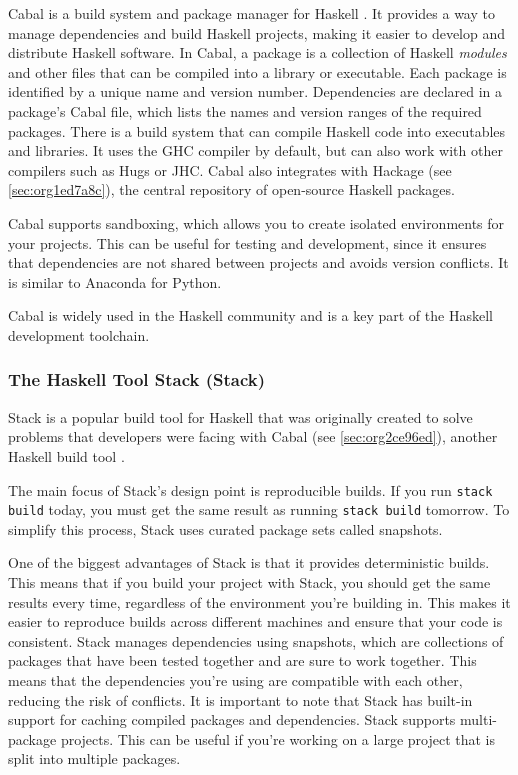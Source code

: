 \documentclass[a4paper, titlepage, twoside]{article}
\begin{document}
Cabal is a build system and package manager for Haskell \autocite{Cabal2023}. It provides a way to manage dependencies and build Haskell projects, making it easier to develop and distribute Haskell software. In Cabal, a package is a collection of Haskell \emph{modules} and other files that can be compiled into a library or executable. Each package is identified by a unique name and version number. Dependencies are declared in a package's Cabal file, which lists the names and version ranges of the required packages. There is a build system that can compile Haskell code into executables and libraries. It uses the GHC compiler by default, but can also work with other compilers such as Hugs or JHC. Cabal also integrates with Hackage (see \ref{sec:org1ed7a8c}), the central repository of open-source Haskell packages.

Cabal supports sandboxing, which allows you to create isolated environments for your projects. This can be useful for testing and development, since it ensures that dependencies are not shared between projects and avoids version conflicts. It is similar to Anaconda for Python.

Cabal is widely used in the Haskell community and is a key part of the Haskell development toolchain.

\subsubsection{The Haskell Tool Stack (Stack)}
\label{sec:org390bc14}

Stack is a popular build tool for Haskell that was originally created to solve problems that developers were facing with Cabal (see \ref{sec:org2ce96ed}), another Haskell build tool \autocite{CommercialhaskellStack2023}.

The main focus of Stack's design point is reproducible builds. If you run \texttt{stack build} today, you must get the same result as running \texttt{stack build} tomorrow. To simplify this process, Stack uses curated package sets called snapshots.

One of the biggest advantages of Stack is that it provides deterministic builds. This means that if you build your project with Stack, you should get the same results every time, regardless of the environment you're building in. This makes it easier to reproduce builds across different machines and ensure that your code is consistent. Stack manages dependencies using snapshots, which are collections of packages that have been tested together and are sure to work together. This means that the dependencies you're using are compatible with each other, reducing the risk of conflicts. It is important to note that Stack has built-in support for caching compiled packages and dependencies. Stack supports multi-package projects. This can be useful if you're working on a large project that is split into multiple packages.
\end{document}

